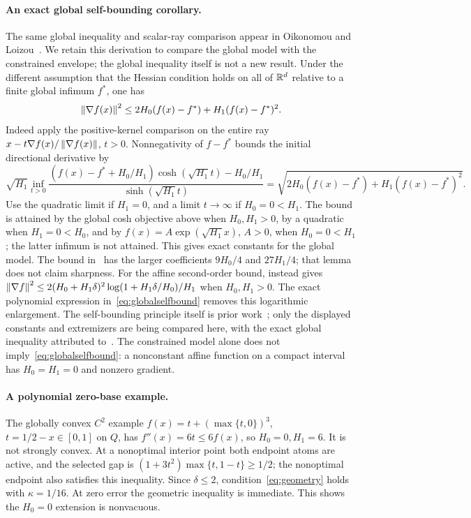 \paragraph{An exact global self-bounding corollary.}
The same global inequality and scalar-ray comparison appear in
Oikonomou and Loizou~\cite[Lemma~B.7, Eq.~(30)]{oikonomouloizou}.
We retain this derivation to compare the global model with the
constrained envelope; the global inequality itself is not a new result.
Under the different assumption that the Hessian condition holds on
all of $\mathbb R^d$ relative to a finite global infimum $f^*$, one has
\begin{equation}\label{eq:globalselfbound}
 \left\|\nabla f(x)\right\|^2\le2H_0(f(x)-f^*)+H_1(f(x)-f^*)^2.
\end{equation}
Indeed apply the positive-kernel comparison on the entire ray
$x-t\nabla f(x)/\left\|\nabla f(x)\right\|$, $t>0$. Nonnegativity of
$f-f^*$ bounds the initial directional derivative by
\[
 \sqrt{H_1}\inf_{t>0}
 \frac{(f(x)-f^*+H_0/H_1)\cosh(\sqrt{H_1}t)-H_0/H_1}
 {\sinh(\sqrt{H_1}t)}
 =\sqrt{2H_0(f(x)-f^*)+H_1(f(x)-f^*)^2}.
\]
Use the quadratic limit if $H_1=0$, and a limit $t\to\infty$
if $H_0=0<H_1$. The bound is attained by the global cosh objective
above when $H_0,H_1>0$, by a quadratic when $H_1=0<H_0$, and by
$f(x)=A\exp(\sqrt{H_1}x)$, $A>0$, when $H_0=0<H_1$; the latter
infimum is not attained. This gives exact constants for the
global model. The bound in~\cite[Appendix G, Lemma 6]{warmup}
has the larger coefficients $9H_0/4$ and $27H_1/4$; that lemma
does not claim sharpness. For the affine second-order bound,
\cite[Corollary 1]{caoselfbound} instead gives
$\left\|\nabla f\right\|^2\le2(H_0+H_1\delta)^2
\log(1+H_1\delta/H_0)/H_1$ when $H_0,H_1>0$.
The exact polynomial expression in~\eqref{eq:globalselfbound}
removes this logarithmic enlargement. The self-bounding principle
itself is prior work~\cite[Lemma 11]{kale}; only the displayed
constants and extremizers are being compared here, with the exact global
inequality attributed to~\cite{oikonomouloizou}.
The constrained model alone does not
imply~\eqref{eq:globalselfbound}: a nonconstant affine function
on a compact interval has $H_0=H_1=0$ and nonzero gradient.

\paragraph{A polynomial zero-base example.}
The globally convex $C^2$ example $f(x)=t+(\max\{t,0\})^3$,
$t=1/2-x\in[0,1]$ on $Q$, has
$f''(x)=6t\le6f(x)$, so $H_0=0,H_1=6$.
It is not strongly convex. At a nonoptimal interior point both
endpoint atoms are active, and the selected gap is
$(1+3t^2)\max\{t,1-t\}\ge1/2$; the nonoptimal endpoint also satisfies
this inequality. Since $\delta\le2$, condition~\eqref{eq:geometry}
holds with $\kappa=1/16$. At zero error the geometric inequality is
immediate. This shows the $H_0=0$ extension is nonvacuous.

